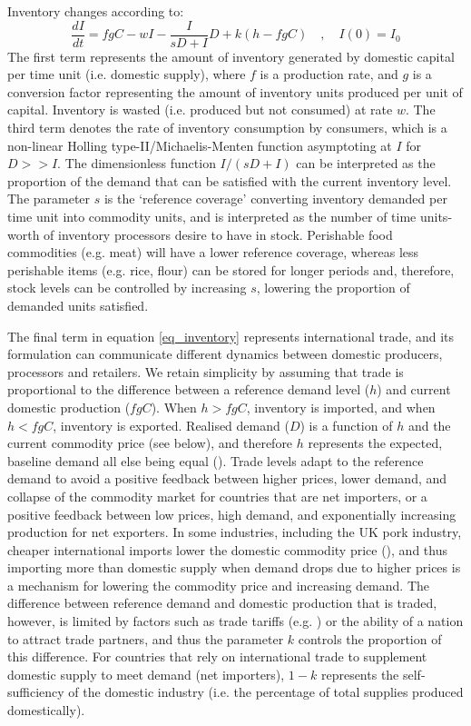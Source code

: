 \documentclass[12pt]{article}
\begin{document}
Inventory changes according to:
%
\begin{equation}
  \frac{dI}{dt} = f g C - w I - \frac{I}{sD + I} D + k (h - f g C) \quad, \quad I(0) = I_0
  \label{eq_inventory}
\end{equation}
%
The first term represents the amount of inventory generated by domestic capital per time unit (i.e. domestic supply), where $f$ is a production rate, and $g$ is a conversion factor representing the amount of inventory units produced per unit of capital. Inventory is wasted (i.e. produced but not consumed) at rate $w$. The third term denotes the rate of inventory consumption by consumers, which is a non-linear Holling type-II/Michaelis-Menten function asymptoting at $I$ for $D >> I$. The dimensionless function $I/(sD + I)$ can be interpreted as the proportion of the demand that can be satisfied with the current inventory level. The parameter $s$ is the `reference coverage' converting inventory demanded per time unit into commodity units, and is interpreted as the number of time units-worth of inventory processors desire to have in stock. Perishable food commodities (e.g. meat) will have a lower reference coverage, whereas less perishable items (e.g. rice, flour) can be stored for longer periods and, therefore, stock levels can be controlled by increasing $s$, lowering the proportion of demanded units satisfied.

The final term in equation \ref{eq_inventory} represents international trade, and its formulation can communicate different dynamics between domestic producers, processors and retailers. We retain simplicity by assuming that trade is proportional to the difference between a reference demand level ($h$) and current domestic production ($f g C$). When $h > f g C$, inventory is imported, and when $h < f g C$, inventory is exported. Realised demand ($D$) is a function of $h$ and the current commodity price (see below), and therefore $h$ represents the expected, baseline demand all else being equal (\cite{sterman2000}). Trade levels adapt to the reference demand to avoid a positive feedback between higher prices, lower demand, and collapse of the commodity market for countries that are net importers, or a positive feedback between low prices, high demand, and exponentially increasing production for net exporters. In some industries, including the UK pork industry, cheaper international imports lower the domestic commodity price (\cite{AHDBeuroexhange2015}), and thus importing more than domestic supply when demand drops due to higher prices is a mechanism for lowering the commodity price and increasing demand. The difference between reference demand and domestic production that is traded, however, is limited by factors such as trade tariffs (e.g. \cite{feng2017}) or the ability of a nation to attract trade partners, and thus the parameter $k$ controls the proportion of this difference. For countries that rely on international trade to supplement domestic supply to meet demand (net importers), $1 - k$ represents the self-sufficiency of the domestic industry (i.e. the percentage of total supplies produced domestically).
\end{document}
